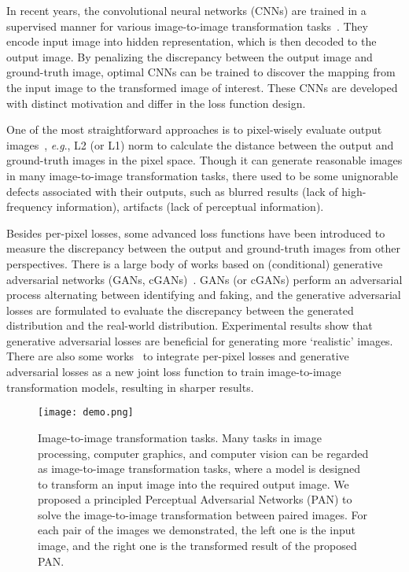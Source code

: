 \documentclass{article}
\newcommand{\eg}{\textit{e}.\textit{g}.}
\begin{document}
In recent years, the convolutional neural networks (CNNs) are trained in a supervised manner for various image-to-image transformation tasks~\cite{fu2016clearing,  pathak2016context, dong2016image, zhang2016colorful}. They encode input image into hidden representation, which is then decoded to the output image. By penalizing the discrepancy between the output image and ground-truth image, optimal CNNs can be trained to discover the mapping from the input image to the transformed image of interest. These CNNs are developed with distinct motivation and differ in the loss function design. 

One of the most straightforward approaches is to pixel-wisely evaluate output images~\cite{dong2016image, cheng2015deep, shelhamer2016fully}, \eg, L2 (or L1) norm to calculate the distance between the output and ground-truth images in the pixel space. Though it can generate reasonable images in many image-to-image transformation tasks, there used to be some unignorable defects associated with their outputs, such as blurred results (lack of high-frequency information), artifacts (lack of perceptual information).

Besides per-pixel losses, some advanced loss functions have been introduced to measure the discrepancy between the output and ground-truth images from other perspectives.  There is a large body of works based on (conditional) generative adversarial networks (GANs, cGANs)~\cite{goodfellow2014generative, mirza2014conditional}. GANs (or cGANs) perform an adversarial process alternating between identifying and faking, and the generative adversarial losses are formulated to evaluate the discrepancy between the generated distribution and the real-world distribution. Experimental results show that generative adversarial losses are beneficial for generating more `realistic' images. 
There are also some works~\cite{pathak2016context, isola2016image} to integrate per-pixel losses and generative adversarial losses as a new joint loss function to train image-to-image transformation models, resulting in sharper results.

\begin{figure*}[!t]
\centering
\texttt{[image: demo.png]}
\caption{Image-to-image transformation tasks. Many tasks in image processing, computer graphics, and computer vision can be regarded as image-to-image transformation tasks, where a model is designed to transform an input image into the required output image. We proposed a principled Perceptual Adversarial Networks (PAN) to solve the image-to-image transformation between paired images. For each pair of the images we demonstrated, the left one is the input image, and the right one is the transformed result of the proposed PAN.}
\label{Demo}
\end{figure*}
\end{document}
